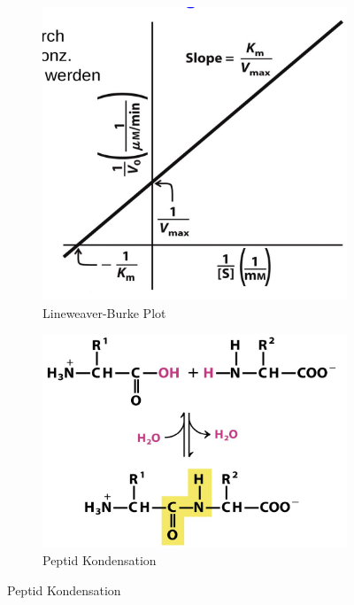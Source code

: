 \documentclass[a4paper,twocolumn,usegeometry,english,fontsize=6,DIV=16]{scrartcl}
\begin{document}
\begin{figure}
	\centering
	\begin{subfigure}{.4\linewidth}
		\centering
		\includegraphics[width=\linewidth]{img/lb.png}
		\caption{Lineweaver-Burke Plot}
	\end{subfigure}%
	\begin{subfigure}{.6\linewidth}
		\centering
		\includegraphics[width=\linewidth]{img/peptid_kond.png}
		\caption{Peptid Kondensation}
	\end{subfigure}%
\end{figure}
\end{document}
